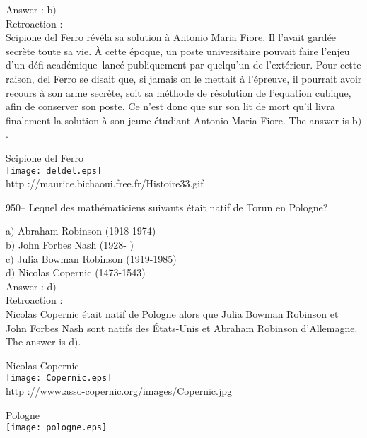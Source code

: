 ﻿\documentclass[letterpaper, 12pt]{article}
\begin{document}
Answer : b$)$\\

Retroaction : \\
Scipione del Ferro r\'ev\'ela sa solution \`a Antonio Maria Fiore.
Il l'avait gard\'ee secr\`ete toute sa vie. \`A cette \'epoque, un
poste universitaire pouvait faire l'enjeu d'un \og d\'efi
acad\'emique\fg\ lanc\'e publiquement par quelqu'un de
l'ext\'erieur. Pour cette raison, del Ferro se disait que, si jamais
on le mettait \`a l'\'epreuve, il pourrait avoir recours \`a son
arme secr\`ete, soit sa m\'ethode de r\'esolution de l'equation
cubique, afin de conserver son poste. Ce n'est donc que sur son lit
de mort qu'il livra finalement la solution \`a son jeune
\'etudiant Antonio Maria Fiore. The answer is b$)$.\\

        \begin{center}
        Scipione del Ferro\\
    \texttt{[image: deldel.eps]}\\
        {\footnotesize http ://maurice.bichaoui.free.fr/Histoire33.gif}
    \end{center}

950-- Lequel des math\'ematiciens suivants \'etait natif de Torun en
Pologne?

a$)$ Abraham Robinson (1918-1974) \\
b$)$ John Forbes Nash (1928- ) \\
c$)$ Julia Bowman Robinson (1919-1985) \\
d$)$ Nicolas Copernic (1473-1543) \\

Answer : d$)$\\

Retroaction : \\
Nicolas Copernic \'etait natif de Pologne alors que Julia Bowman
Robinson et John Forbes Nash sont natifs des \'Etats-Unis
et Abraham Robinson d'Allemagne. The answer is d$)$.\\

        \begin{center}
        Nicolas Copernic\\
    \texttt{[image: Copernic.eps]}\\
        {\footnotesize http ://www.asso-copernic.org/images/Copernic.jpg}
    \end{center}

        \begin{center}
        Pologne\\
    \texttt{[image: pologne.eps]}\\
    \end{center}
\end{document}
